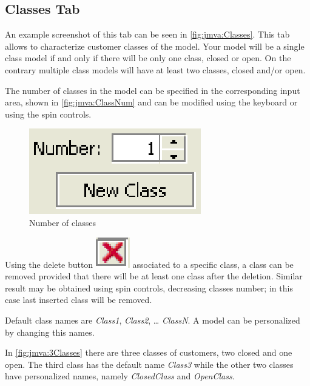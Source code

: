 \subsection{Classes Tab}
An example screenshot of this tab can be seen in
\autoref{fig:jmva:Classes}. This tab allows to characterize customer
classes of the model. Your model will be a single class model if and
only if there will be only one class, closed or open. On the
contrary multiple class models will have at least two classes,
closed and/or open.

The number of classes in the model can be specified in the
corresponding input area, shown in \autoref{fig:jmva:ClassNum} and
can be modified using the keyboard or using the spin controls.

\begin{figure}[htbp]
    \begin{center}
        \includegraphics[scale=.5]{img/jmva/classNum}
    \end{center}
    \caption{Number of classes}
    \label{fig:jmva:ClassNum}
\end{figure}

Using the delete button
\includegraphics[scale=.6]{img/jmva/x} associated to a specific
class, a class can be removed provided that there will be at least
one class after the deletion. Similar result may be obtained using
spin controls, decreasing classes number; in this case last inserted
class will be removed.

Default class names are \emph{Class1}, \emph{Class2}, \dots
\emph{ClassN}. A model can be personalized by changing this names.

In \autoref{fig:jmva:3Classes} there are three classes of customers,
two closed and one open. The third class has the default name
\emph{Class3} while the other two classes have personalized names,
namely \emph{ClosedClass} and \emph{OpenClass}.

